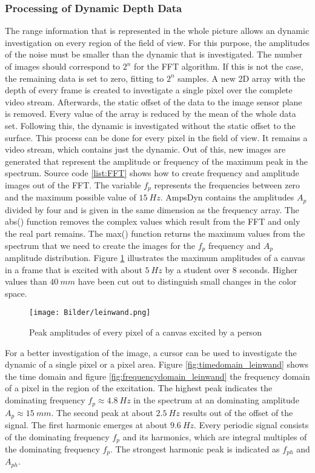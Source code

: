 \subsubsection{Processing of Dynamic Depth Data} \label{sec:Dynamic_pixel}
The range information that is represented in the whole picture allows an dynamic investigation on every region of the field of view. For this purpose, the amplitudes of the noise must be smaller than the dynamic that is investigated. The number of images should correspond to $2^n$ for the FFT algorithm. If this is not the case, the remaining data is set to zero, fitting to $2^n$ samples. A new 2D array with the depth of every frame is created to investigate a single pixel over the complete video stream. Afterwards, the static offset of the data to the image sensor plane is removed. Every value of the array is reduced by the mean of the whole data set. Following this, the dynamic is investigated without the static offset to the surface. This process can be done for every pixel in the field of view. It remains a video stream, which contains just the dynamic. Out of this, new images are generated that represent the amplitude or frequency of the maximum peak in the spectrum. Source code \ref{list:FFT} shows how to create frequency and amplitude images out of the FFT. The variable $f_{p}$ represents the frequencies between zero and the maximum possible value of $15~Hz$. AmpsDyn contains the amplitudes $A_{p}$ divided by four and is given in the same dimension as the frequency array. The abs() function removes the complex values which result from the FFT and only the real part remains. The max() function returns the maximum values from the spectrum that we need to create the images for the $f_{p}$ frequency and $A_{p}$ amplitude distribution. Figure \ref{fig:Leinwand_FFT} illustrates the maximum amplitudes of a canvas in a frame that is excited with about $5~Hz$ by a student over 8 seconds. Higher values than $40~mm$ have been cut out to distinguish small changes in the color space.

\begin{figure}[!h]
	\centering
	\texttt{[image: Bilder/leinwand.png]}
	\caption{Peak amplitudes of every pixel of a canvas excited by a person}
	\label{fig:Leinwand_FFT}
\end{figure}

For a better investigation of the image, a cursor can be used to investigate the dynamic of a single pixel or a pixel area. Figure \ref{fig:timedomain_leinwand} shows the time domain and figure \ref{fig:frequencydomain_leinwand} the frequency domain of a pixel in the region of the excitation. The highest peak indicates the dominating frequency $f_p\approx 4.8~Hz$ in the spectrum at an dominating amplitude $A_p\approx 15~mm$. The second peak at about $2.5~Hz$ results out of the offset of the signal. The first harmonic emerges at about $9.6~Hz$. Every periodic signal consists of the dominating frequency $f_p$ and its harmonics, which are integral multiples of the dominating frequency $f_p$. The strongest harmonic peak is indicated as $f_{ph}$ and $A_{ph}$.


